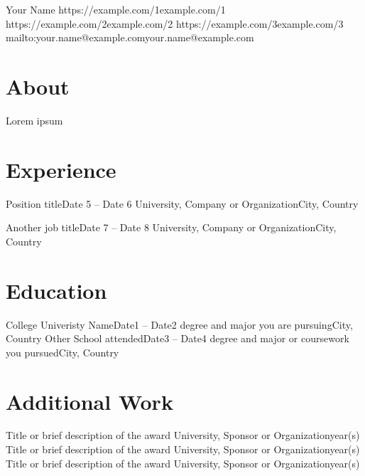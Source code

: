 \documentclass[a4paper,11pt]{article}
\begin{document}
\resumetitle
{Your Name}
{https://example.com/1}{example.com/1}
{https://example.com/2}{example.com/2}
{https://example.com/3}{example.com/3}
{mailto:your.name@example.com}{your.name@example.com}

\section{About}
Lorem ipsum

\section{Experience}
\resumeStructuredListStart

\resumeStructuredItem
{Position title}{Date 5 -- Date 6}
{University, Company or Organization}{City, Country}
\resumeItemListStart
{}
\resumeItemListEnd

\resumeStructuredItem
{Another job title}{Date 7 -- Date 8}
{University, Company or Organization}{City, Country}
\resumeItemListStart
{}
\resumeItemListEnd

\resumeStructuredListEnd

\section{Education}
\resumeStructuredListStart

\resumeStructuredItem
{College Univeristy Name}{Date1 -- Date2}
{degree and major you are pursuing}{City, Country}
\resumeStructuredItem
{Other School attended}{Date3 -- Date4}
{degree and major or coursework you pursued}{City, Country}

\resumeStructuredListEnd

\section{Additional Work}
\resumeStructuredListStart
\resumeStructuredItem
{Title or brief description of the award}{}
{University, Sponsor or Organization}{year(s)}
\resumeStructuredItem
{Title or brief description of the award}{}
{University, Sponsor or Organization}{year(s)}
\resumeStructuredItem
{Title or brief description of the award}{}
{University, Sponsor or Organization}{year(s)}
\resumeStructuredListEnd
\end{document}
